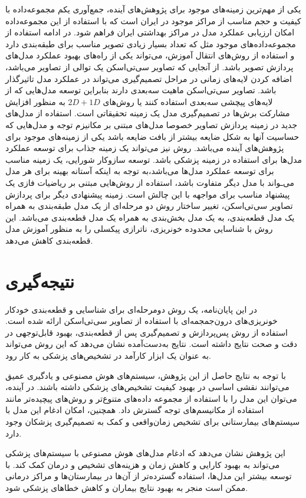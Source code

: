 یکی از مهم‌ترین زمینه‌های موجود برای پژوهش‌های آینده، جمع‌آوری یکم مجموعه‌داده با کیفیت و حجم مناسب از مراکز موجود در ایران است که با استفاده از این مجموعه‌داده امکان ارزیابی عملکرد مدل در مراکز بهداشتی ایران فراهم شود. در ادامه استفاده از مجموعه‌داده‌های موجود مثل
\cite{rsna_hemorrhage_detection_kaggle}
که تعداد بسیار زیادی تصویر مناسب برای طبقه‌بندی دارد و استفاده از روش‌های انتقال آموزش،‌ می‌تواند یکی از راه‌های بهبود عملکرد مدل‌های پردازش تصویر باشد. 
از آنجایی که تصاویر سی‌تی‌اسکن یک توالی از تصاویر می‌باشد، اضافه کردن لایه‌های زمانی در مراحل تصمیم‌گیری می‌تواند در عملکرد مدل تاثیرگذار باشد. تصاویر سی‌تی‌اسکن ماهیت سه‌بعدی دارند بنابراین توسعه مدل‌هایی که از لایه‌های پیچشی سه‌بعدی استفاده کنند یا روش‌های 
$2D+1D$
به منظور افزایش مشارکت برش‌ها در تصمیم‌گیری مدل یک زمینه تحقیقاتی است.
استفاده از مدل‌های جدید در زمینه پردازش تصاویر خصوصا مدل‌های مبتنی بر مکانیزم 
توجه و مدل‌هایی که حساسیت آنها به شکل ضایعه بیشتر از بافت ضایعه باشد یکی از زمینه‌های موجود برای پژوهش‌های آینده می‌باشد.
روش 
نیز می‌تواند یک زمینه جذاب برای توسعه عملکرد مدل‌ها برای استفاده در زمینه پزشکی باشد. 
توسعه سازوکار شورایی،‌ یک زمینه مناسب برای توسعه عملکرد مدل‌ها می‌باشد،‌به توجه به اینکه آستانه بهینه برای هر مدل می‌ـواند با مدل دیگر متفاوت باشد،‌ استفاده از روش‌هایی مبتنی بر ریاضیات فازی یک پیشنهاد مناسب برای مواجهه با این چالش است. زمینه پیشنهادی دیگر برای پردازش تصاویر سی‌تی‌اسکن، تغییر ساختار روش دو مرحله‌ای از یک مدل طبقه‌بندی به همراه یک مدل قطعه‌بندی، به یک مدل بخش‌بندی به همراه یک مدل قطعه‌بندی می‌باشد. این روش با شناسایی محدوده خونریزی، ناترازی پیکسلی را به منظور آموزش مدل قطعه‌بندی کاهش می‌دهد. 
 
\section{نتیجه‌گیری}
در این پایان‌نامه، یک روش دومرحله‌ای برای شناسایی و قطعه‌بندی خودکار خونریزی‌های درون‌جمجمه‌ای با استفاده از تصاویر سی‌تی‌اسکن ارائه شده است. استفاده از روش پس‌پردازش و تصمیم‌گیری پس از قطعه‌بندی، بهبود قابل‌توجهی در دقت و صحت نتایج داشته است. نتایج به‌دست‌آمده نشان می‌دهد که این روش می‌تواند به عنوان یک ابزار کارآمد در تشخیص‌های پزشکی به کار رود.

با توجه به نتایج حاصل از این پژوهش، سیستم‌های هوش مصنوعی و یادگیری عمیق می‌توانند نقشی اساسی در بهبود کیفیت تشخیص‌های پزشکی داشته باشند. در آینده، می‌توان این مدل را با استفاده از مجموعه داده‌های متنوع‌تر و روش‌های پیچیده‌تر مانند استفاده از مکانیسم‌های توجه گسترش داد. همچنین، امکان ادغام این مدل با سیستم‌های بیمارستانی برای تشخیص زمان‌واقعی و کمک به تصمیم‌گیری پزشکان وجود دارد.

این پژوهش نشان می‌دهد که ادغام مدل‌های هوش مصنوعی با سیستم‌های پزشکی می‌تواند به بهبود کارایی و کاهش زمان و هزینه‌های تشخیص و درمان کمک کند. با توسعه بیشتر این مدل‌ها، استفاده گسترده‌تر از آن‌ها در بیمارستان‌ها و مراکز درمانی ممکن است منجر به بهبود نتایج بیماران و کاهش خطاهای پزشکی شود.
